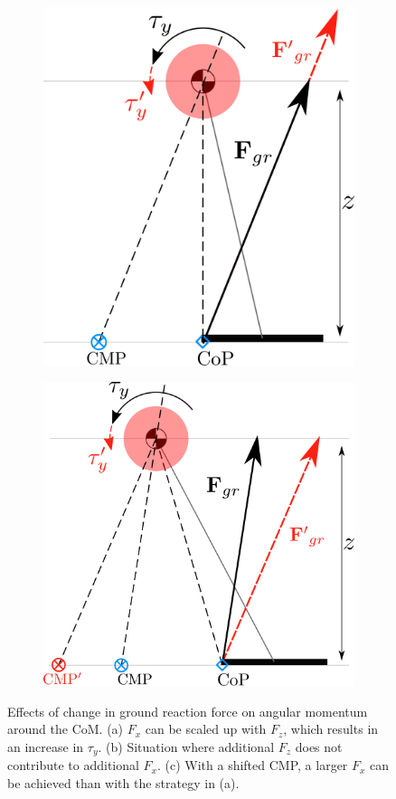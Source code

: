 \begin{figure}[h]
\begin{subfigure}{0.3\textwidth}
  \includegraphics[width=.8\linewidth]{STYLESTUFF/2DCMPVIZCoPzero.png}
  \caption{}
   \label{fig:cmpFzb}
  \end{subfigure}
  \begin{subfigure}{0.36\textwidth}
    \centering
  \includegraphics[width=.8\linewidth]{STYLESTUFF/2DCMPVIZFgradjusted.png}
    \caption{}
     \label{fig:cmpFzc}
  \end{subfigure}
  \caption{Effects of change in ground reaction force on angular momentum around the \ac{CoM}. (a) $F_x$ can be scaled up with $F_z$, which results in an increase in $\tau_y$. (b) Situation where additional $F_z$ does not contribute to additional $F_x$. (c) With a shifted \ac{CMP}, a larger $F_x$ can be achieved than with the strategy in (a). }
  \label{fig:cmpFz}
\end{figure}
